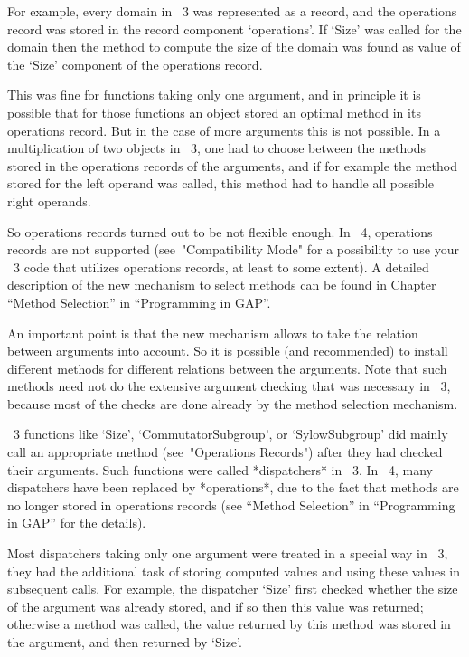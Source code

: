 For example, every domain in {\GAP}~3 was represented as a record, and
the operations record was stored in the record component `operations'.
If `Size' was called for the domain then the method to compute the
size of the domain was found as value of the `Size' component of the
operations record.

This was fine for functions taking only one argument, and in principle
it is possible that for those functions an object stored an optimal
method in its operations record.  But in the case of more arguments
this is not possible.  In a multiplication of two objects in {\GAP}~3,
one had to choose between the methods stored in the operations records
of the arguments, and if for example the method stored for the left
operand was called, this method had to handle all possible right
operands.

So operations records turned out to be not flexible enough.  In
{\GAP}~4, operations records are not supported (see~"Compatibility
Mode" for a possibility to use your {\GAP}~3 code that utilizes
operations records, at least to some extent).  A detailed description
of the new mechanism to select methods can be found in
Chapter ``Method Selection'' in ``Programming in GAP''.

An important point is that the new mechanism allows {\GAP} to take the
relation between arguments into account.  So it is possible (and
recommended) to install different methods for different relations
between the arguments.  Note that such methods need not do the
extensive argument checking that was necessary in {\GAP}~3, because
most of the checks are done already by the method selection mechanism.



{\GAP}~3 functions like `Size', `CommutatorSubgroup', or
`SylowSubgroup' did mainly call an appropriate method (see~"Operations
Records") after they had checked their arguments.  Such functions were
called *dispatchers* in {\GAP}~3.  In {\GAP}~4, many dispatchers have
been replaced by *operations*, due to the fact that methods are no
longer stored in operations records (see ``Method Selection'' in
``Programming in GAP'' for the details).

Most dispatchers taking only one argument were treated in a special
way in {\GAP}~3, they had the additional task of storing computed
values and using these values in subsequent calls.  For example, the
dispatcher `Size' first checked whether the size of the argument was
already stored, and if so then this value was returned; otherwise a
method was called, the value returned by this method was stored in the
argument, and then returned by `Size'.

